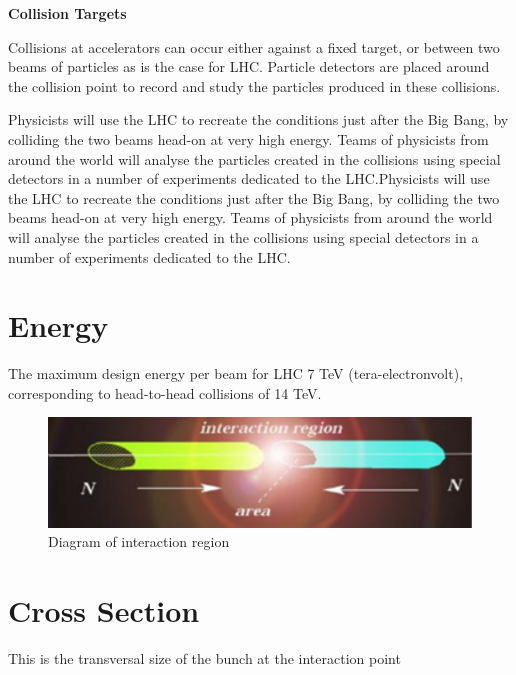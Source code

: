 \;
\;
\;

\noindent
\textbf{Collision Targets}

\;
\;

\noindent
Collisions at accelerators can occur either against a fixed target, or between two beams of particles as is the case for LHC. Particle detectors are placed around the collision point to record and study the particles produced in these collisions.

\;
\noindent
Physicists will use the LHC to recreate the conditions just after the Big Bang, by colliding the two beams head-on at very high energy. Teams of physicists from around the world will analyse the particles created in the collisions using special detectors in a number of experiments dedicated to the LHC.Physicists will use the LHC to recreate the conditions just after the Big Bang, by colliding the two beams head-on at very high energy. Teams of physicists from around the world will analyse the particles created in the collisions using special detectors in a number of experiments dedicated to the LHC.


\section{Energy}


\noindent
The maximum design energy per beam for LHC 7 TeV (tera-electronvolt), corresponding to head-to-head collisions of 14 TeV.

\;
\;
\;

\begin{figure}[h]
\centering\includegraphics[scale=1.0]{./Particleaccelerators/Pictures/fig3.pdf}
\caption{Diagram of interaction region}
\label{fig:pdgdedx}
\end{figure}

\;
\;


\section{Cross Section}


\noindent
This is the transversal size of the bunch at the interaction point

